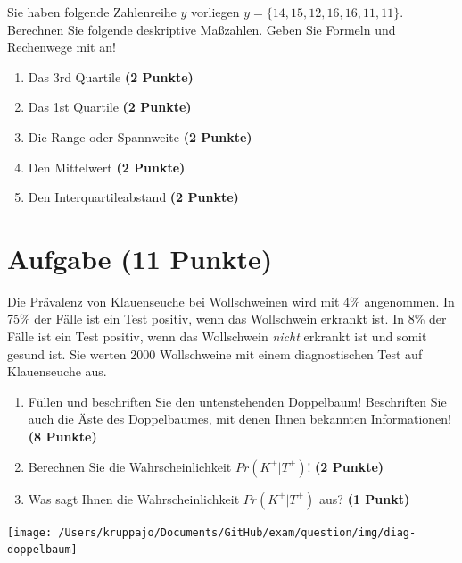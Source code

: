 \documentclass[a4paper, 10pt]{scrartcl}\usepackage[]{graphicx}\usepackage[]{xcolor}
\begin{document}
Sie haben folgende Zahlenreihe $y$ vorliegen
$y = \{14, 15, 12, 16, 16, 11, 11\}$. Berechnen Sie folgende
deskriptive Ma{\ss}zahlen. Geben Sie Formeln und Rechenwege mit an!



\begin{enumerate}
\item Das 3rd Quartile \textbf{(2 Punkte)}
\item Das 1st Quartile \textbf{(2 Punkte)}
\item Die Range oder Spannweite \textbf{(2 Punkte)}
\item Den Mittelwert \textbf{(2 Punkte)}
\item Den Interquartileabstand \textbf{(2 Punkte)}
\end{enumerate}
 
\clearpage

\section{Aufgabe \hfill (11 Punkte)}

Die Pr{\"a}valenz von Klauenseuche bei Wollschweinen wird mit
4\% angenommen. In 75\% der F{\"a}lle ist ein Test positiv, wenn das Wollschwein erkrankt
ist. In 8\% der F{\"a}lle ist ein Test positiv,
wenn das Wollschwein \textit{nicht} erkrankt ist und somit gesund ist. Sie
werten 2000 Wollschweine mit einem
diagnostischen Test auf Klauenseuche aus.



\begin{enumerate}
\item F{\"u}llen und beschriften Sie den untenstehenden Doppelbaum! Beschriften
  Sie auch die {\"A}ste des Doppelbaumes, mit denen Ihnen bekannten
  Informationen!  \textbf{(8 Punkte)}
\item Berechnen Sie die Wahrscheinlichkeit $Pr(K^+|T^+)$! \textbf{(2 Punkte)}
\item Was sagt Ihnen die Wahrscheinlichkeit $Pr(K^+|T^+)$ aus? \textbf{(1 Punkt)}
\end{enumerate}

\vspace{1cm}

\begin{center}
  \texttt{[image: /Users/kruppajo/Documents/GitHub/exam/question/img/diag-doppelbaum]}
\end{center}
\end{document}
